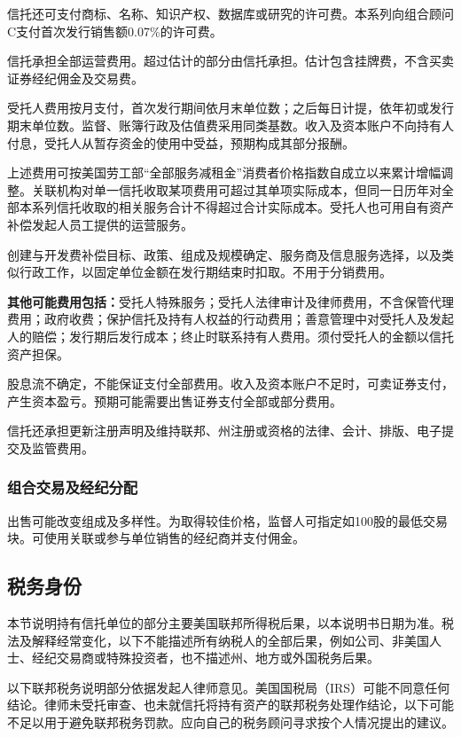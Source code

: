 \documentclass[UTF8,fontset=none,11pt,a4paper]{ctexart}
\begin{document}
信托还可支付商标、名称、知识产权、数据库或研究的许可费。本系列向组合顾问C支付首次发行销售额0.07\%\allowbreak\mbox{的许可费。}


信托承担全部运营费用。超过估计的部分由信托承担。估计包含挂牌费，不含买卖证券经纪佣金\allowbreak\mbox{及交易费。}


受托人费用按月支付，首次发行期间依月末单位数；之后每日计提，依年初或发行期末单位数。监督、账簿行政及估值费采用同类基数。收入及资本账户不向持有人付息，受托人从暂存资金的使用中受益，预期构成其\allowbreak\mbox{部分报酬。}


上述费用可按美国劳工部“全部服务减租金”消费者价格指数自成立以来累计增幅调整。关联机构对单一信托收取某项费用可超过其单项实际成本，但同一日历年对全部本系列信托收取的相关服务合计不得超过合计实际成本。受托人也可用自有资产补偿发起人员工提供的\allowbreak\mbox{运营服务。}


创建与开发费补偿目标、政策、组成及规模确定、服务商及信息服务选择，以及类似行政工作，以固定单位金额在发行期结束时扣取。不用于\allowbreak\mbox{分销费用。}


\textbf{其他可能费用包括：}受托人特殊服务；受托人法律审计及律师费用，不含保管代理费用；政府收费；保护信托及持有人权益的行动费用；善意管理中对受托人及发起人的赔偿；发行期后发行成本；终止时联系持有人费用。须付受托人的金额以信托\allowbreak\mbox{资产担保。}


股息流不确定，不能保证支付全部费用。收入及资本账户不足时，可卖证券支付，产生资本盈亏。预期可能需要出售证券支付全部或\allowbreak\mbox{部分费用。}


信托还承担更新注册声明及维持联邦、州注册或资格的法律、会计、排版、电子提交及\allowbreak\mbox{监管费用。}


\subsubsection*{组合交易及经纪分配}
出售可能改变组成及多样性。为取得较佳价格，监督人可指定如100股的最低交易块。可使用关联或参与单位销售的经纪商并\allowbreak\mbox{支付佣金。}


\subsection*{税务身份}
本节说明持有信托单位的部分主要美国联邦所得税后果，以本说明书日期为准。税法及解释经常变化，以下不能描述所有纳税人的全部后果，例如公司、非美国人士、经纪交易商或特殊投资者，也不描述州、地方或外国\allowbreak\mbox{税务后果。}


以下联邦税务说明部分依据发起人律师意见。美国国税局（IRS）可能不同意任何结论。律师未受托审查、也未就信托将持有资产的联邦税务处理作结论，以下可能不足以用于避免联邦税务罚款。应向自己的税务顾问寻求按个人情况提出\allowbreak\mbox{的建议。}
\end{document}
